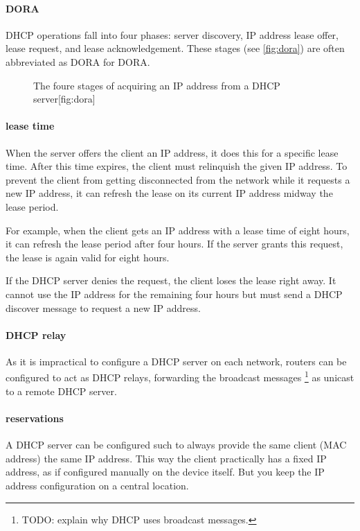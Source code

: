 \paragraph{\acs{DORA}}
\gls{DHCP} operations fall into four phases: server discovery, \acs{IP} address lease offer, lease request, and lease acknowledgement.
These stages (see \vref{fig:dora}) are often abbreviated as \acs{DORA} for \acl{DORA}.

\begin{figure}
\begin{sidecaption}{The foure stages of acquiring an \acs{IP} address from a \acs{DHCP} server}[fig:dora]
\centering

\end{sidecaption}
\end{figure}

\paragraph{lease time}
When the server offers the client an \acs{IP} address, it does this for a specific lease time.
After this time expires, the client must relinquish the given \acs{IP} address.
To prevent the client from getting disconnected from the network while it requests a new \acs{IP} address, it can refresh the lease on its current \acs{IP} address midway the lease period.

For example, when the client gets an \acs{IP} address with a lease time of eight hours, it can refresh the lease period after four hours.
If the server grants this request, the lease is again valid for eight hours.

If the \acs{DHCP} server denies the request, the client loses the lease right away.
It cannot use the \acs{IP} address for the remaining four hours but must send a \acs{DHCP} discover message to request a new \acs{IP} address.

\paragraph{\acs{DHCP} relay}
As it is impractical to configure a \acs{DHCP} server on each network, routers can be configured to act as \acs{DHCP} relays, forwarding the broadcast messages%
   \footnote{TODO: explain why \acs{DHCP} uses broadcast messages.}
as unicast to a remote \acs{DHCP} server.

\paragraph{reservations}
A \acs{DHCP} server can be configured such to always provide the same client (\acs{MAC} address) the same \acs{IP} address.
This way the client practically has a fixed \acs{IP} address, as if configured manually on the device itself.
But you keep the \acs{IP} address configuration on a central location.




